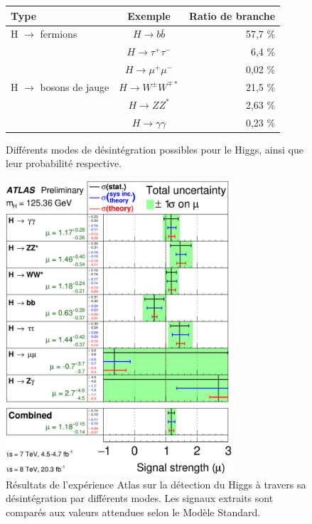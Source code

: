 \documentclass[11pt]{article} %
\begin{document}
\begin{figure}[H]
\centering
\begin{tabular}{|l|c|r|} 
   \hline
   Type & Exemple & Ratio de branche\\
    \hline
    H $\to$ fermions & $H \to b\bar{b} $ & 57,7 \% \\
    \cline{2-3} 
        & $H \to \tau^+\tau^-$ & 6,4 \% \\
   \cline{2-3} 
        & $H \to \mu^+\mu^-$ & 0,02 \%\\
    \hline
  H $\to$ bosons de jauge & $H \to W^{\pm}W^{\mp*}$ &21,5 \% \\
   \cline{2-3}
     & $H \to ZZ^*$ & 2,63 \% \\
   \cline{2-3}
      & $H \to \gamma \gamma$ & 0,23 \% \\
  \hline
\end{tabular}
\caption{\label{fig:decay_modes}Différents modes de désintégration possibles pour le Higgs, ainsi que leur probabilité respective. }
\end{figure}


\begin{figure}[H]
\centering
  \caption{Résultats de l'expérience Atlas sur la détection du Higgs à travers sa désintégration par différents modes. Les signaux extraits sont comparés aux valeurs attendues selon le Modèle Standard.}
\label{fig:signal_strength}
 \includegraphics[width=0.75\textwidth]{../images/fig_02.png}
\end{figure}
\end{document}
